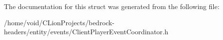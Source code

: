 The documentation for this struct was generated from the following file\+:\begin{DoxyCompactItemize}
\item 
/home/void/\+C\+Lion\+Projects/bedrock-\/headers/entity/events/Client\+Player\+Event\+Coordinator.\+h\end{DoxyCompactItemize}
